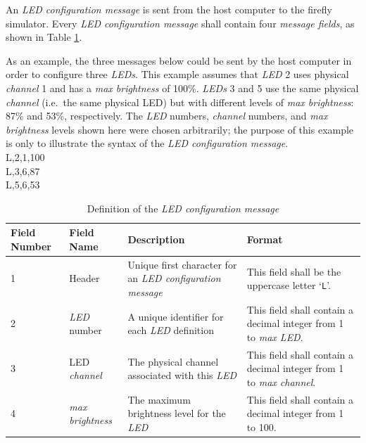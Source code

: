 \documentclass[letterpaper,11pt]{article}
\begin{document}
An \textit{LED configuration message} is sent from the host computer to the
firefly simulator. Every \textit{LED configuration message} shall contain
four \textit{message fields}, as shown in Table \ref{tab:LEDConfig}.

As an example, the three messages below could be sent by the host computer in
order to configure three \textit{LEDs}.
This example assumes that \textit{LED} 2 uses physical \textit{channel}
1 and has a \textit{max brightness} of 100\%. \textit{LEDs} 3 and 5 use the
same physical \textit{channel} (i.e.\ the same physical LED) but with different
levels of \textit{max brightness}: 87\% and 53\%, respectively.
The \textit{LED} numbers, \textit{channel} numbers, and \textit{max brightness}
levels shown here were chosen
arbitrarily; the purpose of this example is only to illustrate the syntax of
the \textit{LED configuration message}.\\[12pt]
{\ttfamily
L,2,1,100\\
L,3,6,87\\
L,5,6,53\\
}

\begin{table}[H]
  \caption{Definition of the \textit{LED configuration message}}
  \centering
  \setlength\extrarowheight{2pt}
  \begin{tabular}[h]{|p{0.5in}|p{1.00in}|p{2.25in}|p{2.25in}|} \hline
    Field Number & Field Name & Description & Format \\ \hline
    1            & Header
    & Unique first character for an \textit{LED configuration message}
    & This field shall be the uppercase letter `\texttt{L}'.
    \\ \hline
    2            & \textit{LED} number
    & A unique identifier for each \textit{LED} definition
    & This field shall contain a decimal integer from 1 to \textit{max LED}.
    \\ \hline
    3            & LED \textit{channel}
    & The physical channel associated with this \textit{LED}
    & This field shall contain a decimal integer from 1 to \textit{max channel}.
    \\ \hline
    4            & \textit{max brightness}
    & The maximum brightness level for the \textit{LED}
    & This field shall contain a decimal integer from 1 to 100.
    \\ \hline
  \end{tabular}
  \label{tab:LEDConfig}
\end{table}
\end{document}
